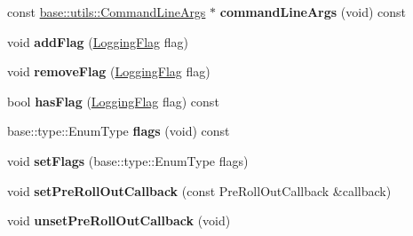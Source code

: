 \begin{DoxyCompactItemize}
\item 
const \hyperlink{classel_1_1base_1_1utils_1_1CommandLineArgs}{base\+::utils\+::\+Command\+Line\+Args} $\ast$ {\bfseries command\+Line\+Args} (void) const \hypertarget{classel_1_1base_1_1Storage_a84f3d208bead8a8b2c15834be7f30f8d}{}\label{classel_1_1base_1_1Storage_a84f3d208bead8a8b2c15834be7f30f8d}

\item 
void {\bfseries add\+Flag} (\hyperlink{namespaceel_a2784aacd04cb7816ac1c0b20fcbf83cb}{Logging\+Flag} flag)\hypertarget{classel_1_1base_1_1Storage_a3e17c61961f3b2f45e8ec77e3320bed5}{}\label{classel_1_1base_1_1Storage_a3e17c61961f3b2f45e8ec77e3320bed5}

\item 
void {\bfseries remove\+Flag} (\hyperlink{namespaceel_a2784aacd04cb7816ac1c0b20fcbf83cb}{Logging\+Flag} flag)\hypertarget{classel_1_1base_1_1Storage_aaecbb6ae954d0bf748ac7f3c980a9173}{}\label{classel_1_1base_1_1Storage_aaecbb6ae954d0bf748ac7f3c980a9173}

\item 
bool {\bfseries has\+Flag} (\hyperlink{namespaceel_a2784aacd04cb7816ac1c0b20fcbf83cb}{Logging\+Flag} flag) const \hypertarget{classel_1_1base_1_1Storage_ab569cf6e09897b0520dee7f4d1fb742e}{}\label{classel_1_1base_1_1Storage_ab569cf6e09897b0520dee7f4d1fb742e}

\item 
base\+::type\+::\+Enum\+Type {\bfseries flags} (void) const \hypertarget{classel_1_1base_1_1Storage_a0a8da674f034011c50b0479307677855}{}\label{classel_1_1base_1_1Storage_a0a8da674f034011c50b0479307677855}

\item 
void {\bfseries set\+Flags} (base\+::type\+::\+Enum\+Type flags)\hypertarget{classel_1_1base_1_1Storage_a5df88c56b8d923c20568e50ceb0bdd64}{}\label{classel_1_1base_1_1Storage_a5df88c56b8d923c20568e50ceb0bdd64}

\item 
void {\bfseries set\+Pre\+Roll\+Out\+Callback} (const Pre\+Roll\+Out\+Callback \&callback)\hypertarget{classel_1_1base_1_1Storage_a626165bc5c8808b733707294ce2a0dc8}{}\label{classel_1_1base_1_1Storage_a626165bc5c8808b733707294ce2a0dc8}

\item 
void {\bfseries unset\+Pre\+Roll\+Out\+Callback} (void)\hypertarget{classel_1_1base_1_1Storage_a2bfdc3a20eeafe158ee8603c805131e4}{}\label{classel_1_1base_1_1Storage_a2bfdc3a20eeafe158ee8603c805131e4}


\end{DoxyCompactItemize}
